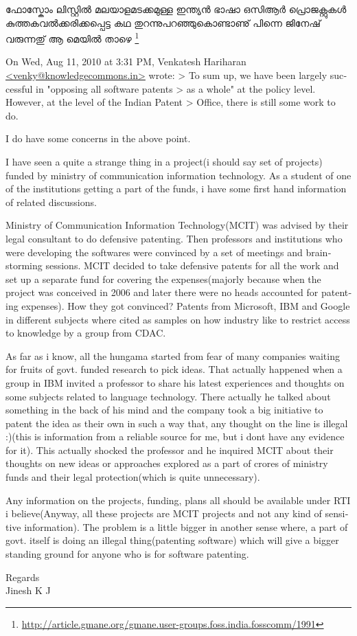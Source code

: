 ഫോസ്കോം ലിസ്റ്റില്‍  മലയാളമടക്കമുള്ള ഇന്ത്യന്‍ ഭാഷാ ഒസിആര്‍ പ്രൊജക്റ്റുകള്‍ കുത്തകവല്‍ക്കരിക്കപ്പെട്ട കഥ തുറന്നുപറഞ്ഞുകൊണ്ടാണു് പിന്നെ ജിനേഷ് വരുന്നതു്  ആ മെയില്‍ താഴെ \footnote{\url{http://article.gmane.org/gmane.user-groups.foss.india.fosscomm/1991}}

\begin{english}
On Wed, Aug 11, 2010 at 3:31 PM, Venkatesh Hariharan
\url{<venky@knowledgecommons.in>} wrote:
> To sum up, we have been largely successful in "opposing all software patents
> as a whole" at the policy level. However, at the level of the Indian Patent
> Office, there is still some work to do.

I do have some concerns in the above point.

I have seen a quite a strange thing in a project(i should say set of
projects) funded by ministry of communication information technology.
As a student of one of the institutions getting a part of the funds, i have some
first hand information of related discussions.

Ministry of Communication Information Technology(MCIT) was advised by
their legal consultant to do defensive patenting. Then professors and
institutions who were developing
the softwares were convinced by a set of meetings and brainstorming
sessions. MCIT decided to take defensive patents for all the work and
set up a separate fund for covering the expenses(majorly because when
the project was conceived in 2006 and later there were no heads
accounted for patenting expenses). How they got convinced? Patents
from Microsoft, IBM and Google in different subjects where
cited as samples on how industry like to restrict access to knowledge
by a group from CDAC.

As far as i know, all the hungama started from fear of many companies
waiting for fruits of govt. funded research to pick ideas. That actually
happened when a group in IBM invited a professor to share his latest
experiences
and thoughts on some subjects related to language technology. There
actually he talked
about something in the back of his mind and the company took a big
initiative to patent the idea as their own in such a way that, any
thought on the line is illegal :)(this is information from a reliable
source for me, but i dont have any evidence for it). This actually
shocked the professor and he inquired  MCIT about their thoughts on
new ideas or approaches explored as a part of crores of ministry funds
and their legal protection(which is quite unnecessary).

Any information on the projects, funding, plans all should be
available under RTI i believe(Anyway, all these projects are MCIT
projects and not any kind of sensitive information). The
problem is a little bigger in another sense where, a part of govt.
itself is doing an illegal thing(patenting software) which will give a
bigger standing ground for anyone who is for software patenting.

Regards\\
Jinesh K J
\end{english}

